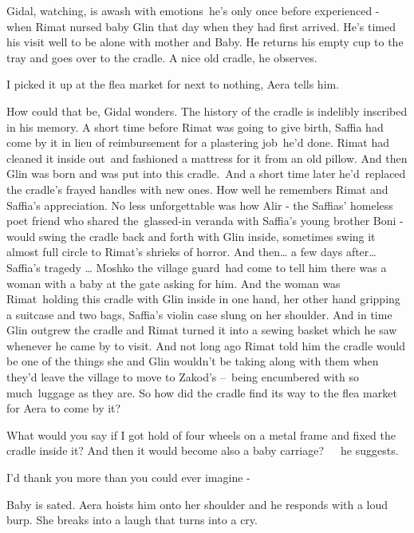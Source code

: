 \documentclass[twoside,11pt]{book}
\begin{document}
Gidal, watching, is awash with emotions{\ }he's only once before experienced - when Rimat nursed baby
Glin that day when they had first arrived. He's timed his visit well to be alone with mother and Baby. He returns his
empty cup to the tray and goes over to the cradle. {\textquotedbl}A nice old cradle,{\textquotedbl} he
observes{.}

{\textquotedbl}I picked it up at the flea market for next to nothing,{\textquotedbl} Aera tells
him{.}

How could that be, Gidal wonders. The history of the cradle is indelibly inscribed in his memory. A short time before
Rimat was going to give birth, Saffia had come by it in lieu of reimbursement for a plastering
job{\ }he'd done. Rimat had cleaned it inside out~and fashioned a mattress for
it from an old pillow. And then Glin was born and was put into this cradle.\ And a short time later he{}'d\ replaced
the cradle's frayed handles with new ones. How well he remembers Rimat and Saffia's appreciation. No less unforgettable
was how Alir - the Saffias' homeless poet friend who shared the\ glassed-in veranda with Saffia's young brother Boni -
would swing the cradle back and forth with Glin inside, sometimes swing it almost full circle to Rimat's shrieks of
horror. And then{\dots} a few days after{\dots} Saffia's tragedy {\dots} Moshko the village guard~had come to tell him
there was a woman with a baby at the gate asking for him. And the woman was Rimat~holding this cradle with Glin inside
in one hand, her other hand gripping a suitcase and two bags, Saffia's violin case slung on her shoulder. And in time
Glin outgrew the cradle and Rimat turned it into a sewing basket which he saw whenever he came by to visit. And not
long ago Rimat told him the cradle would be one of the things she and Glin wouldn{}'t be taking along with them when
they{}'d leave the village to move to Zakod's {{}--}\ being encumbered with so
much\ luggage as they are. So how did the cradle find its way to the flea market for Aera to come by it?

{\textquotedbl}What would you say if I got hold of four wheels on a metal frame and fixed the cradle inside it? And then
it would become also a baby carriage?{\textquotedbl}\ \ \ he suggests.

{\textquotedbl}I'd thank you more than you could ever imagine -{\textquotedbl} 

Baby is sated. Aera hoists him onto her shoulder and he responds with a loud burp. She breaks into a laugh that turns
into a cry. 
\end{document}
